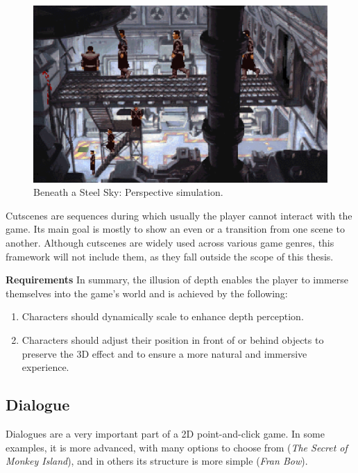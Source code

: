 \begin{figure}[H]
\centering
\includegraphics[width=.75\linewidth]{img/M-BaSS00.png}
\caption{Beneath a Steel Sky: Perspective simulation.}
\label{fig:M-BaSS0}
\end{figure}


\begin{notImplemented}
 \par
\vspace{3mm}
Cutscenes are sequences during which usually the player cannot interact with the game. Its main goal is mostly to show an even or a transition from one scene to another. Although cutscenes are widely used across various game genres, this framework will not include them, as they fall outside the scope of this thesis.
\end{notImplemented}

\textbf{Requirements} \quad In summary, the illusion of depth enables the player to immerse themselves into the game's world and is achieved by the following:

\begin{enumerate}[label=\color{teal}\textbf{R{\arabic*}},resume]
  \item \label{intro:req:scale} Characters should dynamically scale to enhance depth perception.
  \item \label{intro:req:layers} Characters should adjust their position in front of or behind objects to preserve the 3D effect and to ensure a more natural and immersive experience.
\end{enumerate}
    
\subsection{Dialogue}
\label{sec:Dialogue}
Dialogues are a very important part of a 2D point-and-click game. In some examples, it is more advanced, with many options to choose from (\textit{The Secret of Monkey Island}), and in others its structure is more simple (\textit{Fran Bow}).  

